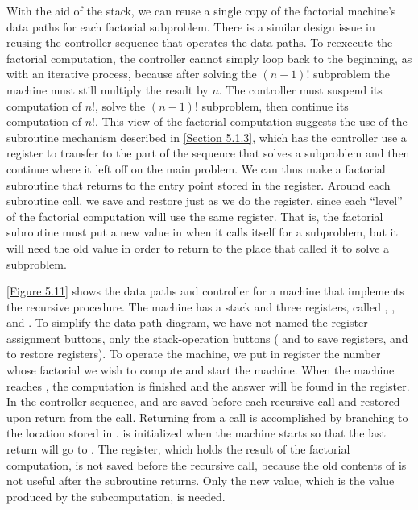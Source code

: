 With the aid of the stack, we can reuse a single copy of the factorial machine’s data paths for each factorial subproblem.
There is a similar design issue in reusing the controller sequence that operates the data paths.
To reexecute the factorial computation, the controller cannot simply loop back to the beginning, as with an iterative process, because after solving the \( (n - 1)! \) subproblem the machine must still multiply the result by \( n \).
The controller must suspend its computation of \( n! \), solve the \( (n - 1)! \) subproblem, then continue its computation of \( n! \).
This view of the factorial computation suggests the use of the subroutine mechanism described in \cref{Section 5.1.3}, which has the controller use a  register to transfer to the part of the sequence that solves a subproblem and then continue where it left off on the main problem.
We can thus make a factorial subroutine that returns to the entry point stored in the  register.
Around each subroutine call, we save and restore  just as we do the  register, since each “level” of the factorial computation will use the same  register.
That is, the factorial subroutine must put a new value in  when it calls itself for a subproblem, but it will need the old value in order to return to the place that called it to solve a subproblem.

\cref{Figure 5.11} shows the data paths and controller for a machine that implements the recursive  procedure.
The machine has a stack and three registers, called , , and .
To simplify the data-path diagram, we have not named the register-assignment buttons, only the stack-operation buttons ( and  to save registers,  and  to restore registers).
To operate the machine, we put in register  the number whose factorial we wish to compute and start the machine.
When the machine reaches , the computation is finished and the answer will be found in the  register.
In the controller sequence,  and  are saved before each recursive call and restored upon return from the call.
Returning from a call is accomplished by branching to the location stored in .
 is initialized when the machine starts so that the last return will go to .
The  register, which holds the result of the factorial computation, is not saved before the recursive call, because the old contents of  is not useful after the subroutine returns.
Only the new value, which is the value produced by the subcomputation, is needed.

